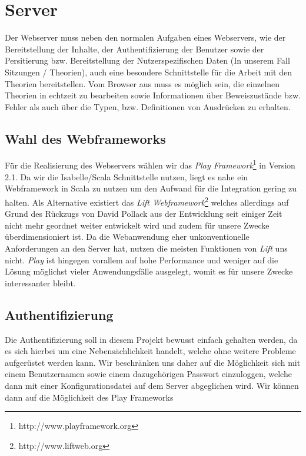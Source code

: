 \section{Server}

Der Webserver muss neben den normalen Aufgaben eines Webservers, wie der Bereitstellung der Inhalte,
der Authentifizierung der Benutzer sowie der Persitierung bzw. Bereitstellung der Nutzerspezifischen
Daten (In unserem Fall Sitzungen / Theorien), auch eine besondere Schnittstelle für die Arbeit mit
den Theorien bereitstellen. Vom Browser aus muss es möglich sein, die einzelnen Theorien in echtzeit
zu bearbeiten sowie Informationen über Beweiszustände bzw. Fehler als auch über die Typen, bzw.
Definitionen von Ausdrücken zu erhalten.

\subsection{Wahl des Webframeworks}

Für die Realisierung des Webservers wählen wir das \textit{Play
Framework}\footnote{http://www.playframework.org} in Version 2.1. Da wir die Isabelle/Scala
Schnittstelle nutzen, liegt es nahe ein Webframework in Scala zu nutzen um den Aufwand für die
Integration gering zu halten. Als Alternative existiert das \textit{Lift
Webframework}\footnote{http://www.liftweb.org} welches allerdings auf Grund des Rückzugs von David
Pollack aus der Entwicklung seit einiger Zeit nicht mehr geordnet weiter entwickelt wird und zudem
für unsere Zwecke überdimensioniert ist. Da die Webanwendung eher unkonventionelle Anforderungen an
den Server hat, nutzen die meisten Funktionen von \textit{Lift} uns nicht. \textit{Play} ist
hingegen vorallem auf hohe Performance und weniger auf die Lösung möglichst vieler Anwendungsfälle
ausgelegt, womit es für unsere Zwecke interessanter bleibt.

\subsection{Authentifizierung}

Die Authentifizierung soll in diesem Projekt bewusst einfach gehalten werden, da es sich hierbei um
eine Nebensächlichkeit handelt, welche ohne weitere Probleme aufgerüstet werden kann. Wir
beschränken uns daher auf die Möglichkeit sich mit einem Benutzernamen sowie einem dazugehörigen
Passwort einzuloggen, welche dann mit einer Konfigurationsdatei auf dem Server abgeglichen wird. Wir
können dann auf die Möglichkeit des Play Frameworks

